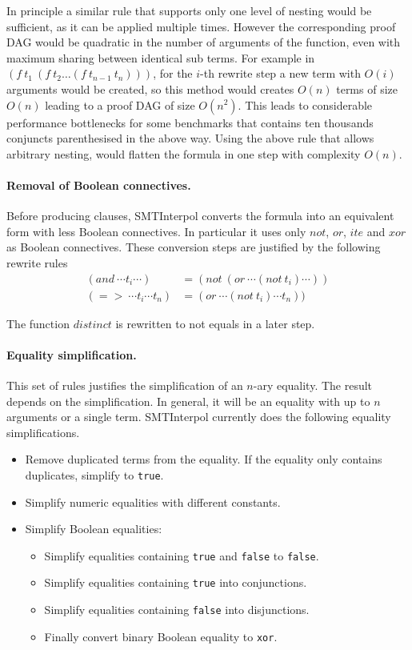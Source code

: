 \documentclass[a4paper]{article}
\newcommand\si{SMTInterpol\xspace}
\begin{document}
In principle a similar rule that supports only one level of nesting
would be sufficient, as it can be applied multiple times.  However the
corresponding proof DAG would be quadratic in the number of arguments
of the function, even with maximum sharing between identical sub
terms.  For example in $(f\ t_1\ (f\ t_2 \dots (f\ t_{n-1}\ t_n)))$, for
the $i$-th rewrite step a new term with $O(i)$ arguments would be
created, so this method would creates $O(n)$ terms of size $O(n)$
leading to a proof DAG of size $O(n^2)$.  This leads to considerable
performance bottlenecks for some benchmarks that contains ten
thousands conjuncts parenthesised in the above way.  Using the above
rule that allows arbitrary nesting, would flatten the formula in one
step with complexity $O(n)$.

\paragraph{Removal of Boolean connectives.}  Before producing clauses, \si
converts the formula into an equivalent form with less Boolean connectives.
In particular it uses only $not$, $or$, $ite$ and $xor$ as Boolean connectives.
These conversion steps are justified by the following rewrite rules
\begin{align}
  (and\ \cdots t_i\cdots) &=
  (not\ (or\ \cdots (not\ t_i)\cdots))
  \tag{andToOr}\\
  (=>\ \cdots t_i\cdots t_n) &=
  (or\ \cdots (not\ t_i)\cdots t_n))
  \tag{impToOr}
\end{align}

The function $distinct$ is rewritten to not equals in a later step.

\paragraph{Equality simplification.}
This set of rules justifies the simplification of an $n$-ary equality.  The
result depends on the simplification.  In general, it will be an equality with
up to $n$ arguments or a single term.  \si currently does the following
equality simplifications.
\begin{itemize}
\item Remove duplicated terms from the equality.  If the equality only
  contains duplicates, simplify to \verb+true+.
\item Simplify numeric equalities with different constants.
\item Simplify Boolean equalities:
  \begin{itemize}
  \item Simplify equalities containing \verb+true+ and \verb+false+ to
    \verb+false+.
  \item Simplify equalities containing \verb+true+ into conjunctions.
  \item Simplify equalities containing \verb+false+ into disjunctions.
  \item Finally convert binary Boolean equality to \verb+xor+.
  \end{itemize}
\end{itemize}
\end{document}
